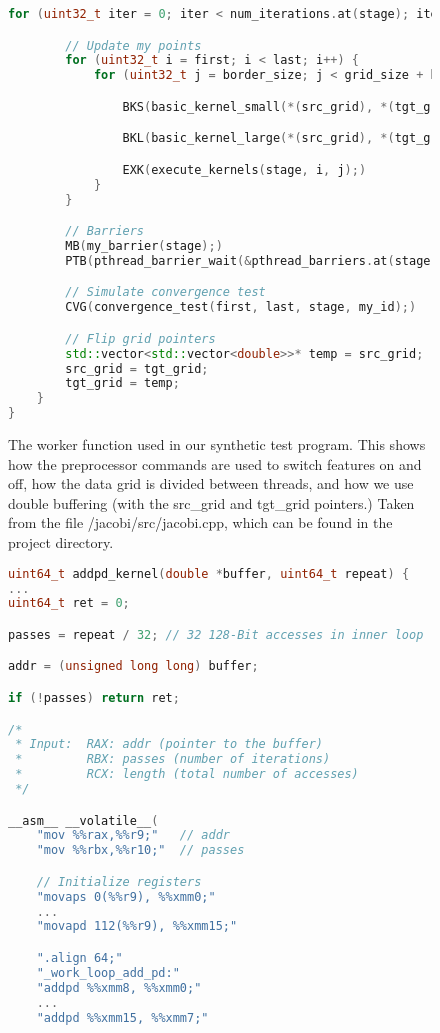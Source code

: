 \begin{appendices}
\begin{figure}
\begin{lstlisting}[language=C++]
	for (uint32_t iter = 0; iter < num_iterations.at(stage); iter++) {

		// Update my points
		for (uint32_t i = first; i < last; i++) {
			for (uint32_t j = border_size; j < grid_size + border_size; j++) {

				BKS(basic_kernel_small(*(src_grid), *(tgt_grid), i, j);)

				BKL(basic_kernel_large(*(src_grid), *(tgt_grid), i, j);)

				EXK(execute_kernels(stage, i, j);)
			}
		}

		// Barriers
		MB(my_barrier(stage);)
		PTB(pthread_barrier_wait(&pthread_barriers.at(stage));)

  		// Simulate convergence test
		CVG(convergence_test(first, last, stage, my_id);)

		// Flip grid pointers
		std::vector<std::vector<double>>* temp = src_grid;
		src_grid = tgt_grid;
		tgt_grid = temp;
	}
}
\end{lstlisting}
\caption{The worker function used in our synthetic test program. This shows how the preprocessor commands are used to switch features on and off, how the data grid is divided between threads, and how we use double buffering (with the src\_grid and tgt\_grid pointers.) Taken from the file /jacobi/src/jacobi.cpp, which can be found in the project directory.}
\label{fig:worker}
\end{figure}



\begin{figure}
\begin{lstlisting}[language=C++]
uint64_t addpd_kernel(double *buffer, uint64_t repeat) {
...
uint64_t ret = 0;

passes = repeat / 32; // 32 128-Bit accesses in inner loop

addr = (unsigned long long) buffer;

if (!passes) return ret;

/*
 * Input:  RAX: addr (pointer to the buffer)
 *         RBX: passes (number of iterations)
 *         RCX: length (total number of accesses)
 */

__asm__ __volatile__(
    "mov %%rax,%%r9;"   // addr
    "mov %%rbx,%%r10;"  // passes

    // Initialize registers
    "movaps 0(%%r9), %%xmm0;"
    ...
    "movapd 112(%%r9), %%xmm15;"

    ".align 64;"
    "_work_loop_add_pd:"
    "addpd %%xmm8, %%xmm0;"
    ...
    "addpd %%xmm15, %%xmm7;"


\end{lstlisting}
\end{figure}
\end{appendices}
